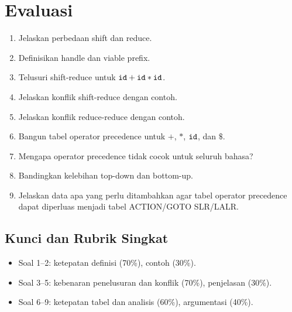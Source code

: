 \section*{Evaluasi}

\begin{enumerate}[label=\arabic*.,leftmargin=*]
  \item Jelaskan perbedaan shift dan reduce.
  \item Definisikan handle dan viable prefix.
  \item Telusuri shift-reduce untuk \(\texttt{id} + \texttt{id} *
        \texttt{id}\).
  \item Jelaskan konflik shift-reduce dengan contoh.
  \item Jelaskan konflik reduce-reduce dengan contoh.
  \item Bangun tabel operator precedence untuk \(+\), \(*\),
        \(\texttt{id}\), dan \(\$\).
  \item Mengapa operator precedence tidak cocok untuk seluruh bahasa?
  \item Bandingkan kelebihan top-down dan bottom-up.
  \item Jelaskan data apa yang perlu ditambahkan agar tabel operator
        precedence dapat diperluas menjadi tabel ACTION/GOTO SLR/LALR.
\end{enumerate}

\subsection*{Kunci dan Rubrik Singkat}
\begin{itemize}[leftmargin=*]
  \item Soal 1--2: ketepatan definisi (70\%), contoh (30\%).
  \item Soal 3--5: kebenaran penelusuran dan konflik (70\%),
        penjelasan (30\%).
  \item Soal 6--9: ketepatan tabel dan analisis (60\%),
        argumentasi (40\%).
\end{itemize}
